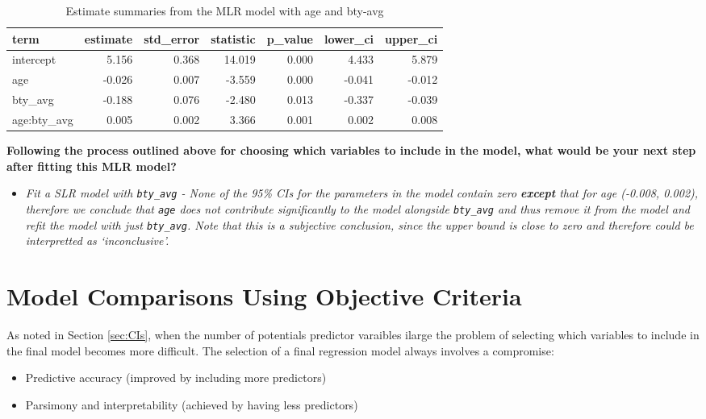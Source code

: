 \documentclass[]{article}
\providecommand{\tightlist}{%
  \setlength{\itemsep}{0pt}\setlength{\parskip}{0pt}}
\begin{document}
\begin{table}[!h]

\caption{\label{tab:table6}Estimate summaries from the MLR model with age and bty-avg}
\centering
\begin{tabular}[t]{lrrrrrr}
\toprule
term & estimate & std\_error & statistic & p\_value & lower\_ci & upper\_ci\\
\midrule
intercept & 5.156 & 0.368 & 14.019 & 0.000 & 4.433 & 5.879\\
age & -0.026 & 0.007 & -3.559 & 0.000 & -0.041 & -0.012\\
bty\_avg & -0.188 & 0.076 & -2.480 & 0.013 & -0.337 & -0.039\\
age:bty\_avg & 0.005 & 0.002 & 3.366 & 0.001 & 0.002 & 0.008\\
\bottomrule
\end{tabular}
\end{table}

\textbf{Following the process outlined above for choosing which
variables to include in the model, what would be your next step after
fitting this MLR model?}

\begin{itemize}
\tightlist
\item
  \emph{Fit a SLR model with \texttt{bty\_avg} - None of the 95\% CIs
  for the parameters in the model contain zero \textbf{except} that for
  age (-0.008, 0.002), therefore we conclude that \texttt{age} does not
  contribute significantly to the model alongside \texttt{bty\_avg} and
  thus remove it from the model and refit the model with just
  \texttt{bty\_avg}. Note that this is a subjective conclusion, since
  the upper bound is close to zero and therefore could be interpretted
  as `inconclusive'.}
\end{itemize}

\newpage

\section{Model Comparisons Using Objective
Criteria}\label{sec:comparisons}

As noted in Section \ref{sec:CIs}, when the number of potentials
predictor varaibles ilarge the problem of selecting which variables to
include in the final model becomes more difficult. The selection of a
final regression model always involves a compromise:

\begin{itemize}
\tightlist
\item
  Predictive accuracy (improved by including more predictors)
\item
  Parsimony and interpretability (achieved by having less predictors)
\end{itemize}
\end{document}
